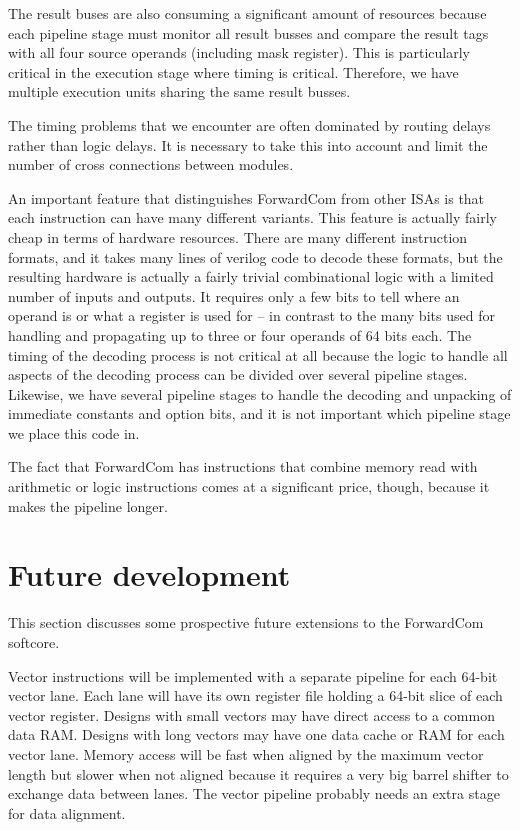 \documentclass[11pt,a4paper,oneside,openright]{report}
\newcommand{\vv}{ \vspace{2mm} }   %
\begin{document}
The result buses are also consuming a significant amount of resources because each pipeline stage must monitor all result busses and compare the result tags with all four source operands (including mask register). This is particularly critical in the execution stage where timing is critical. 
Therefore, we have multiple execution units sharing the same result busses.
\vv

The timing problems that we encounter are often dominated by routing delays rather than logic delays. It is necessary to take this into account and limit the number of cross connections between modules.
\vv

An important feature that distinguishes ForwardCom from other ISAs is that each instruction can have many different variants. This feature is actually fairly cheap in terms of hardware resources. There are many different instruction formats, and it takes many lines of verilog code to decode these formats, but the resulting hardware is actually a fairly trivial combinational logic with a limited number of inputs and outputs. It requires only a few bits to tell where an operand is or what a register is used for -- in contrast to the many bits used for handling and propagating up to three or four operands of 64 bits each. The timing of the decoding process is not critical at all because the logic to handle all aspects of the decoding process can be divided over several pipeline stages. Likewise, we have several pipeline stages to handle the decoding and unpacking of immediate constants and option bits, and it is not important which pipeline stage we place this code in.
\vv

The fact that ForwardCom has instructions that combine memory read with arithmetic or logic instructions comes at a significant price, though, because it makes the pipeline longer. 
\vv


\section{Future development}
This section discusses some prospective future extensions to the ForwardCom softcore.
\vv

Vector instructions will be implemented with a separate pipeline for each 64-bit vector lane. Each lane will have its own register file holding a 64-bit slice of each vector register. Designs with small vectors may have direct access to a common data RAM. Designs with long vectors may have one data cache or RAM for each vector lane. Memory access will be fast when aligned by the maximum vector length but slower when not aligned because it requires a very big barrel shifter to exchange data between lanes. The vector pipeline probably needs an extra stage for data alignment.
\vv
\end{document}
